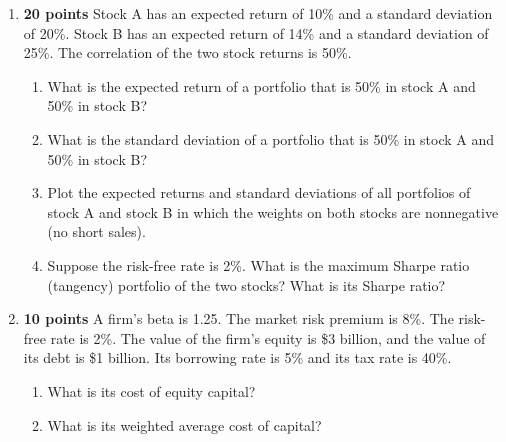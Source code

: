 \documentclass[english,12pt]{amsart}
\begin{document}
\begin{enumerate}
 \item \textbf{20 points} \hspace{0.5ex}  Stock A has an expected return of 10\% and a standard deviation of 20\%.  Stock B has an expected return of 14\% and a standard deviation of 25\%.  The correlation of the two stock returns is 50\%.  
 \begin{enumerate}
     \item What is the expected return of a portfolio that is 50\% in stock A and 50\% in stock B?
     \item What is the standard deviation of a portfolio that is 50\% in stock A and 50\% in stock B?
     \item Plot the expected returns and standard deviations of all portfolios of stock A and stock B in which the weights on both stocks are nonnegative (no short sales).
     \item Suppose the risk-free rate is 2\%.  What is the maximum Sharpe ratio (tangency) portfolio of the two stocks?  What is its Sharpe ratio?
 \end{enumerate}
 \newpage \thispagestyle{plain}
 \item \textbf{10 points} \hspace{0.5ex} A firm's beta is 1.25.  The market risk premium is 8\%.  The risk-free rate is 2\%.  The value of the firm's equity is \$3 billion, and the value of its debt is \$1 billion.  Its borrowing rate is 5\% and its tax rate is 40\%.
 \begin{enumerate}
 \item What is its cost of equity capital?
 \item What is its weighted average cost of capital?
 \end{enumerate}
 \end{enumerate}
 
 
\end{document}
